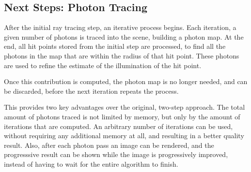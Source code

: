 \documentclass[main.tex]{subfiles}
\begin{document}
\subsection{Next Steps: Photon Tracing}

After the initial ray tracing step, an iterative process begins. Each iteration, a given number of photons is traced into the scene, building a photon map. At the end, all hit points stored from the initial step are processed, to find all the photons in the map that are within the radius of that hit point. These photons are used to refine the estimate of the illumination of the hit point.

Once this contribution is computed, the photon map is no longer needed, and can be discarded, before the next iteration repeats the process.

This provides two key advantages over the original, two-step approach. The total amount of photons traced is not limited by memory, but only by the amount of iterations that are computed. An arbitrary number of iterations can be used, without requiring any additional memory at all, and resulting in a better quality result. Also, after each photon pass an image can be rendered, and the progresssive result can be shown while the image is progressively improved, instead of having to wait for the entire algorithm to finish.
\end{document}
